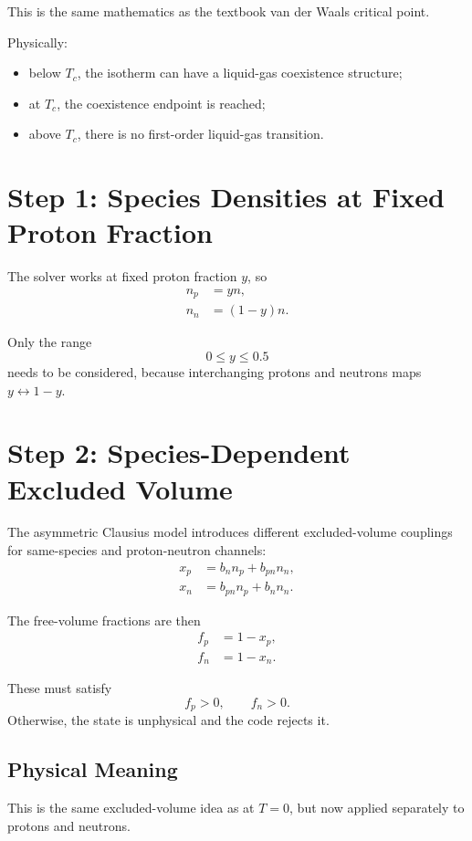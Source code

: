 \documentclass[11pt]{article}
\begin{document}
This is the same mathematics as the textbook van der Waals critical point.

Physically:
\begin{itemize}
\item below $T_c$, the isotherm can have a liquid-gas coexistence structure;
\item at $T_c$, the coexistence endpoint is reached;
\item above $T_c$, there is no first-order liquid-gas transition.
\end{itemize}

\section{Step 1: Species Densities at Fixed Proton Fraction}

The solver works at fixed proton fraction $y$, so
\begin{align}
n_p &= yn, \\
n_n &= (1-y)n.
\end{align}

Only the range
\[
0 \le y \le 0.5
\]
needs to be considered, because interchanging protons and neutrons maps
$y \leftrightarrow 1-y$.

\section{Step 2: Species-Dependent Excluded Volume}

The asymmetric Clausius model introduces different excluded-volume couplings for
same-species and proton-neutron channels:
\begin{align}
x_p &= b_n n_p + b_{pn} n_n, \\
x_n &= b_{pn} n_p + b_n n_n.
\end{align}

The free-volume fractions are then
\begin{align}
f_p &= 1-x_p, \\
f_n &= 1-x_n.
\end{align}

These must satisfy
\[
f_p>0,\qquad f_n>0.
\]
Otherwise, the state is unphysical and the code rejects it.

\subsection{Physical Meaning}

This is the same excluded-volume idea as at $T=0$, but now applied separately
to protons and neutrons.
\end{document}
